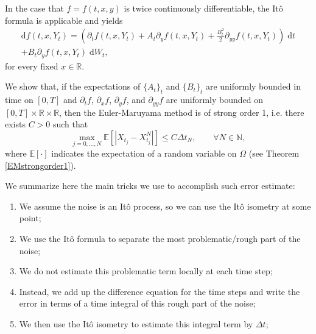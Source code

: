 \documentclass[reqno,12pt]{amsart}
\theoremstyle{plain}%
\theoremstyle{definition}
\begin{document}
In the case that $f=f(t, x, y)$ is twice continuously differentiable, the It\^o formula is applicable and yields
\begin{multline}
  \label{itoformula}
  \mathrm{d}f(t, x, Y_t) = \left(\partial_t f(t, x, Y_t) + A_t \partial_y f(t, x, Y_t)  + \frac{B_t^2}{2}\partial_{yy}f(t, x, Y_t) \right) \;\mathrm{d}t \\ + B_t \partial_y f(t, x, Y_t)\;\mathrm{d}W_t,
\end{multline}
for every fixed $x\in \mathbb{R}$.

We show that, if the expectations of $\{A_t\}_t$ and $\{B_t\}_t$ are uniformly bounded in time on $[0, T]$ and $\partial_t f$, $\partial_x f$, $\partial_y f$, and $\partial_{yy}f$ are uniformly bounded on $[0, T]\times \mathbb{R}\times \mathbb{R}$, then the Euler-Maruyama method is of strong order 1, i.e. there exists $C>0$ such that
\begin{equation}
    \max_{j=0, \ldots, N}\mathbb{E}\left[ \left| X_{t_j} - X_{t_j}^N \right| \right] \leq C \Delta t_N, \qquad \forall N \in \mathbb{N},
\end{equation}
where $\mathbb{E}[\cdot]$ indicates the expectation of a random variable on $\Omega$ (see Theorem \ref{EMstrongorder1}).

We summarize here the main tricks we use to accomplish such error estimate:
\begin{enumerate}
  \item We assume the noise is an It\^o process, so we can use the It\^o isometry at some point;
  \item We use the It\^o formula to separate the most problematic/rough part of the noise;
  \item We do not estimate this problematic term locally at each time step;
  \item Instead, we add up the difference equation for the time steps and write the error in terms of a time integral of this rough part of the noise;
  \item We then use the It\^o isometry to estimate this integral term by $\Delta t$;
\end{enumerate}
\end{document}
